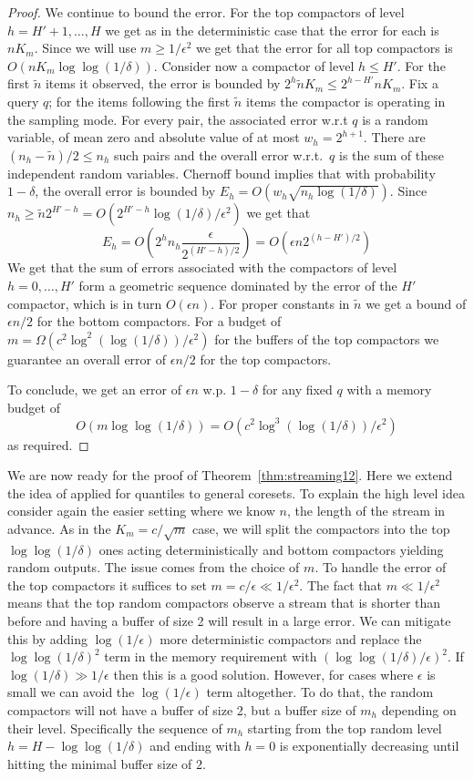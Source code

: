 \documentclass[anon,12pt]{colt2019} %
\newcommand{\eps}{\epsilon}
\begin{document}
\begin{proof}
We continue to bound the error. For the top compactors of level $h=H'+1,\ldots,H$ we get as in the deterministic case that the error for each is $n K_m$. Since we will use $m \geq 1/\eps^2$ we get that the error for all top compactors is $O(nK_m\log\log(1/\delta))$.
Consider now a compactor of level $h \leq H'$. For the first $\tilde{n}$ items it observed, the error is bounded by $2^h\tilde{n}K_m \leq 2^{h-H'}nK_m$. Fix a query $q$; for the items following the first $\tilde{n}$ items the compactor is operating in the sampling mode. For every pair, the associated error w.r.t $q$ is a random variable, of mean zero and absolute value of at most $w_h=2^{h+1}$. There are $(n_h-\tilde{n})/2 \leq n_h$ such pairs and the overall error w.r.t.\ $q$ is the sum of these independent random variables. Chernoff bound implies that with probability $1-\delta$, the overall error is bounded by $E_h = O(w_h\sqrt{n_h\log(1/\delta)})$. Since $n_h \geq \tilde{n}2^{H'-h} = O(2^{H'-h}\log(1/\delta)/\eps^2)$ we get that
$$ E_h = O\left(2^h n_h\frac{\eps}{2^{(H'-h)/2}}\right) = O(\eps n 2^{(h-H')/2}) $$
We get that the sum of errors associated with the compactors of level $h=0,\ldots,H'$ form a geometric sequence dominated by the error of the $H'$ compactor, which is in turn $O(\eps n)$. For proper constants in $\tilde{n}$ we get a bound of $\eps n/2$ for the bottom compactors. For a budget of $m = \Omega(c^2\log^2(\log(1/\delta))/\eps^2)$ for the buffers of the top compactors we guarantee an overall error of $\eps n/2$ for the top compactors. 

To conclude, we get an error of $\eps n$ w.p. $1-\delta$ for any fixed $q$ with a memory budget of
$$O(m\log\log(1/\delta)) = O\left(c^2\log^3(\log(1/\delta))/\eps^2\right)$$
as required.
\end{proof}

We are now ready for the proof of Theorem~\ref{thm:streaming12}. Here we extend the idea of \cite{DBLP:conf/focs/KarninLL16} applied for quantiles to general coresets. To explain the high level idea consider again the easier setting where we know $n$, the length of the stream in advance. As in the $K_m=c/\sqrt{m}$ case, we will split the compactors into the top $\log\log(1/\delta)$ ones acting deterministically and bottom compactors yielding random outputs. The issue comes from the choice of $m$. To handle the error of the top compactors it suffices to set $m=c/\eps \ll 1/\eps^2$. The fact that $m \ll 1/\eps^2$ means that the top random compactors observe a stream that is shorter than before and having a buffer of size 2 will result in a large error. We can mitigate this by adding $\log(1/\eps)$ more deterministic compactors and replace the $\log\log(1/\delta)^2$ term in the memory requirement with $\left(\log\log(1/\delta)/\eps\right)^2$. If $\log(1/\delta) \gg 1/\eps$ then this is a good solution. However, for cases where $\eps$ is small we can avoid the $\log(1/\eps)$ term altogether. To do that, the random compactors will not have a buffer of size 2, but a buffer size of $m_h$ depending on their level. Specifically the sequence of $m_h$ starting from the top random level $h= H-\log\log(1/\delta)$ and ending with $h=0$ is exponentially decreasing until hitting the minimal buffer size of $2$.
\end{document}
